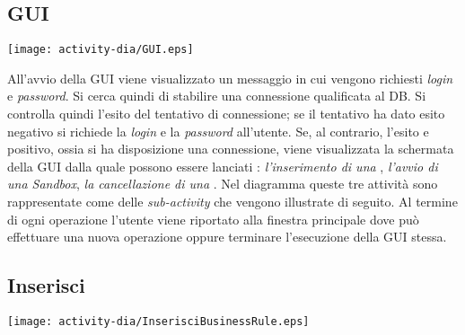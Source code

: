 \subsection{GUI}
\begin{center}
 \texttt{[image: activity-dia/GUI.eps]}
\end{center}
All'avvio della GUI viene visualizzato un messaggio in cui vengono richiesti \textit{login} e \textit{password}. Si cerca quindi di stabilire una connessione qualificata al DB. 
Si controlla quindi l'esito del tentativo di connessione; se il tentativo ha dato esito negativo si richiede la \textit{login} e la
 \textit{password} all'utente. Se, al contrario, l'esito e positivo, ossia si ha disposizione una connessione, viene visualizzata la schermata della GUI dalla quale  possono essere lanciati :\textit{ l'inserimento di una \br}, \textit{l'avvio di una Sandbox}, \textit{la cancellazione di una \br}.
Nel diagramma queste tre attivit\`a sono rappresentate come delle \textit{sub-activity} che vengono illustrate di seguito. Al termine di ogni operazione l'utente viene riportato alla finestra principale dove pu\`o effettuare una nuova operazione oppure terminare l'esecuzione della GUI stessa.

\subsection{Inserisci \br}
\begin{center}
 \texttt{[image: activity-dia/InserisciBusinessRule.eps]}
\end{center}

